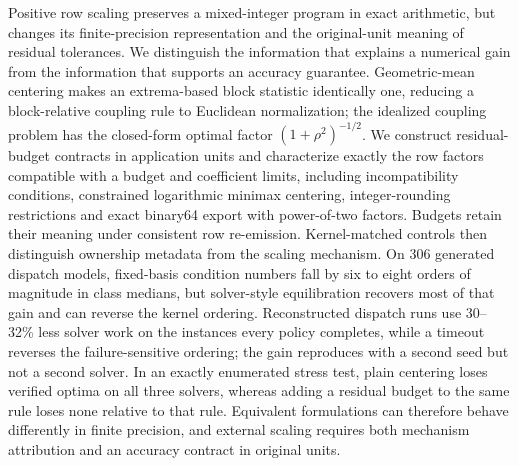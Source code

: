 Positive row scaling preserves a mixed-integer program in exact arithmetic, but changes its
finite-precision representation and the original-unit meaning of residual tolerances.
We distinguish the information that explains a numerical gain from the information that
supports an accuracy guarantee. Geometric-mean centering makes an extrema-based block
statistic identically one, reducing a block-relative coupling rule to Euclidean normalization;
the idealized coupling problem has the closed-form optimal factor $(1+\rho^2)^{-1/2}$.
We construct residual-budget contracts in application units and characterize exactly the row
factors compatible with a budget and coefficient limits, including incompatibility conditions,
constrained logarithmic minimax centering, integer-rounding restrictions and exact binary64
export with power-of-two factors. Budgets retain their meaning under consistent row re-emission.
Kernel-matched controls then distinguish ownership metadata
from the scaling mechanism. On 306 generated dispatch models, fixed-basis condition numbers
fall by six to eight orders of magnitude in class medians, but solver-style equilibration
recovers most of that gain and can reverse the kernel ordering. Reconstructed dispatch runs
use 30--32\% less solver work on the instances every policy completes, while a timeout reverses
the failure-sensitive ordering; the gain reproduces with a second seed but not a second solver.
In an exactly enumerated stress test, plain centering loses verified optima on all three solvers,
whereas adding a residual budget to the same rule loses none relative to that rule.
Equivalent formulations can therefore behave differently in finite precision, and external
scaling requires both mechanism attribution and an accuracy contract in original units.

